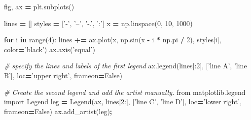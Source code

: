 \documentclass[]{book}
\newenvironment{Shaded}{\begin{snugshade}}{\end{snugshade}}
\newcommand{\KeywordTok}[1]{\textcolor[rgb]{0.13,0.29,0.53}{\textbf{#1}}}
\newcommand{\DecValTok}[1]{\textcolor[rgb]{0.00,0.00,0.81}{#1}}
\newcommand{\StringTok}[1]{\textcolor[rgb]{0.31,0.60,0.02}{#1}}
\newcommand{\ImportTok}[1]{#1}
\newcommand{\CommentTok}[1]{\textcolor[rgb]{0.56,0.35,0.01}{\textit{#1}}}
\newcommand{\VariableTok}[1]{\textcolor[rgb]{0.00,0.00,0.00}{#1}}
\newcommand{\ControlFlowTok}[1]{\textcolor[rgb]{0.13,0.29,0.53}{\textbf{#1}}}
\newcommand{\OperatorTok}[1]{\textcolor[rgb]{0.81,0.36,0.00}{\textbf{#1}}}
\newcommand{\BuiltInTok}[1]{#1}
\newcommand{\NormalTok}[1]{#1}
\begin{document}
\begin{Shaded}
\begin{Highlighting}[]
\NormalTok{fig, ax }\OperatorTok{=}\NormalTok{ plt.subplots()}

\NormalTok{lines }\OperatorTok{=}\NormalTok{ []}
\NormalTok{styles }\OperatorTok{=}\NormalTok{ [}\StringTok{'-'}\NormalTok{, }\StringTok{'--'}\NormalTok{, }\StringTok{'-.'}\NormalTok{, }\StringTok{':'}\NormalTok{]}
\NormalTok{x }\OperatorTok{=}\NormalTok{ np.linspace(}\DecValTok{0}\NormalTok{, }\DecValTok{10}\NormalTok{, }\DecValTok{1000}\NormalTok{)}

\ControlFlowTok{for}\NormalTok{ i }\KeywordTok{in} \BuiltInTok{range}\NormalTok{(}\DecValTok{4}\NormalTok{):}
\NormalTok{    lines }\OperatorTok{+=}\NormalTok{ ax.plot(x, np.sin(x }\OperatorTok{-}\NormalTok{ i }\OperatorTok{*}\NormalTok{ np.pi }\OperatorTok{/} \DecValTok{2}\NormalTok{),}
\NormalTok{                     styles[i], color}\OperatorTok{=}\StringTok{'black'}\NormalTok{)}
\NormalTok{ax.axis(}\StringTok{'equal'}\NormalTok{)}

\CommentTok{# specify the lines and labels of the first legend}
\NormalTok{ax.legend(lines[:}\DecValTok{2}\NormalTok{], [}\StringTok{'line A'}\NormalTok{, }\StringTok{'line B'}\NormalTok{],}
\NormalTok{          loc}\OperatorTok{=}\StringTok{'upper right'}\NormalTok{, frameon}\OperatorTok{=}\VariableTok{False}\NormalTok{)}

\CommentTok{# Create the second legend and add the artist manually.}
\ImportTok{from}\NormalTok{ matplotlib.legend }\ImportTok{import}\NormalTok{ Legend}
\NormalTok{leg }\OperatorTok{=}\NormalTok{ Legend(ax, lines[}\DecValTok{2}\NormalTok{:], [}\StringTok{'line C'}\NormalTok{, }\StringTok{'line D'}\NormalTok{],}
\NormalTok{             loc}\OperatorTok{=}\StringTok{'lower right'}\NormalTok{, frameon}\OperatorTok{=}\VariableTok{False}\NormalTok{)}
\NormalTok{ax.add_artist(leg)}\OperatorTok{;}
\end{Highlighting}
\end{Shaded}
\end{document}
